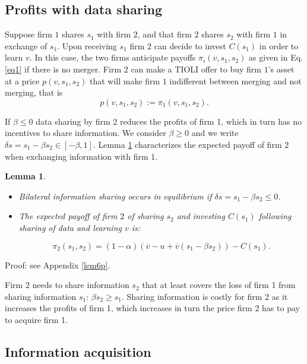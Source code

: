 \documentclass[a4paper,leqno]{article}%
\newtheorem{lemma}{Lemma}
\renewcommand{\a}{\alpha}
\newcommand{\ov}{\overline{v}}
\begin{document}
\subsection{Profits with data sharing}

Suppose firm $1$ shares $s_1$ with firm $2$, and that firm $2$ shares $s_2$ with firm $1$ in exchange of $s_1$. Upon receiving $s_1$ firm 2 can decide to invest $C(s_1)$ in order to learn $v$. In this case, the two firms anticipate payoffs $\pi_i(v, s_1,s_2)$ as given in Eq. \ref{eq1} if there is no merger. Firm $2$ can make a TIOLI offer to buy firm $1$'s asset at a price $p(v, s_1,s_2)$ that will make firm $1$ indifferent between merging and not merging, that is 
%
\begin{equation}
    p(v, s_1,s_2):=\pi_1(v, s_1,s_2).
\end{equation}


If $\beta\leq 0$ data sharing by firm 2 reduces the profits of firm 1, which in turn has no incentives to share information. We consider $\beta\geq 0$ and we write $\delta s=s_1-\beta s_2\in [-\beta,1]$. Lemma \ref{lem6} characterizes the expected payoff of firm 2 when exchanging information with firm 1.

%

\begin{lemma}~~\label{lem6}

\begin{itemize}
    \item Bilateral information sharing occurs in equilibrium if $\delta s=s_1-\beta s_2\leq0$.
    \item The expected payoff of firm $2$ of sharing $s_2$ and investing $C(s_1)$ following sharing of data and learning $v$ is:

    $$\pi_2(s_1,s_2)=(1-\a)(\ov-u+\ov (s_1-\beta s_2))-C(s_1).$$

\end{itemize} 

\end{lemma}

\medskip

\noindent Proof: see Appendix \ref{lem6p}.

\noindent Firm 2 needs to share information $s_2$ that at least covers the loss of firm 1 from sharing information $s_1$: $\beta s_2\geq s_1$. Sharing information is costly for firm 2 as it increases the profits of firm 1, which increases in turn the price firm 2 has to pay to acquire firm 1. 

\subsection{Information acquisition}
\end{document}
